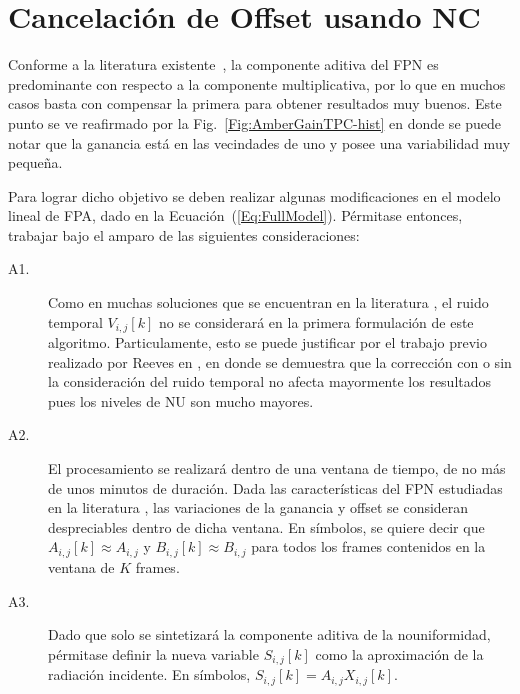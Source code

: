 \section{Cancelación de Offset usando NC}\label{Sec:CancelacionOffset}
Conforme a la literatura existente~\cite{godoy-ncs,sakoglu-spec}, la componente aditiva del \ac{FPN} es predominante con respecto a la componente multiplicativa, por lo que en muchos casos basta con compensar la primera para obtener resultados muy buenos. Este punto se ve reafirmado por la Fig.~\ref{Fig:AmberGainTPC-hist} en donde se puede notar que la ganancia está en las vecindades de uno y posee una variabilidad muy pequeña.

Para lograr dicho objetivo se deben realizar algunas modificaciones en el modelo lineal de \ac{FPA}, dado en la Ecuación~(\ref{Eq:FullModel}). Pérmitase entonces, trabajar bajo el amparo de las siguientes consideraciones:

\begin{description}
 \item[A1.] Como en muchas soluciones que se encuentran en la literatura \cite{zhou-tpc,reeves-thesis,pezoa-cov}, el ruido temporal $V_{i,j}[k]$ no se considerará en la primera formulación de este algoritmo. Particulamente, esto se puede justificar por el trabajo previo realizado por Reeves en \cite{reeves-thesis}, en donde se demuestra que la corrección con o sin la consideración del ruido temporal no afecta mayormente los resultados pues los niveles de \ac{NU} son mucho mayores.

 \item[A2.] El procesamiento se realizará dentro de una ventana de tiempo, de no más de unos minutos de duración. Dada las características del \ac{FPN} estudiadas en la literatura \cite{sakoglu-algebraic04,jara-thesis}, las variaciones de la ganancia y offset se consideran despreciables dentro de dicha ventana. En símbolos, se quiere decir que $A_{i,j}[k] \approx A_{i,j}$ y $B_{i,j}[k] \approx B_{i,j}$ para todos los frames contenidos en la ventana de $K$ frames.

 \item[A3.] Dado que solo se sintetizará la componente aditiva de la nouniformidad, pérmitase definir la nueva variable $S_{i,j}[k]$ como la aproximación de la radiación incidente. En símbolos, $S_{i,j}[k]=A_{i,j} X_{i,j}[k]$.
\end{description}

